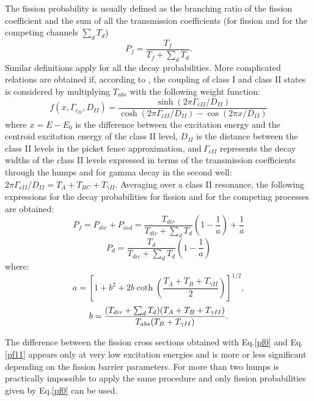The fission probability is usually defined as the branching ratio of the
fission coefficient and the sum of all the transmission coefficients (for
fission and for the competing channels $\sum_dT_d$)
\begin{equation}
P_{f}=\frac{T_{f}}{T_{f}+\sum_{d}T_{d}}.  \label{pf0}
\end{equation}
Similar definitions apply for all the decay probabilities. More complicated
relations are obtained if, according to \cite{Back:74}, the coupling of
class I and class II states is considered by multiplying $T_{abs}$ with the
following weight function:%
\begin{equation}
f(x,\Gamma_{c_{II}},D_{II})=\frac{\sinh(2\pi\Gamma_{cII}/D_{II})}{\cosh
(2\pi\Gamma_{cII}/D_{II})-\cos(2\pi x/D_{II})}
\end{equation}
where $x=E-E_{0}$ is the difference between the excitation energy and the
centroid excitation energy of the class II level, $D_{II}$ is the distance
between the class II levels in the picket fence approximation, and$\ \Gamma
_{cII}$ represents the decay widths of the class II levels expressed in
terms of the transmission coefficients through the humps and for gamma decay
in the second well:\ $2\pi\Gamma_{cII}/D_{II}=T_{A}+T_{BC}+T_{\gamma II}.$
Averaging over a class II resonance, the following expressions for the decay
probabilities for fission and for the competing processes are obtained:%
\begin{equation}
P_{f}=P_{dir}+P_{ind}=\frac{T_{dir}}{T_{dir}+\sum_{d}T_{d}}\left( 1-\frac {1%
}{a}\right) +\frac{1}{a}  \label{pf11}
\end{equation}
\begin{equation}
P_{d}=\frac{T_{d}}{T_{dir}+\sum_{d}T_{d}}\left( 1-\frac{1}{a}\right)
\label{pd}
\end{equation}
where:
\begin{equation}
a=\left[ 1+b^{2}+2b\coth\left( \frac{T_{A}+T_{B}+T_{\gamma II}}{2}\right) %
\right] ^{1/2},  \label{a11}
\end{equation}%
\begin{equation}
b=\frac{(T_{dir}+\sum_{d}T_{d})(T_{A}+T_{B}+T_{\gamma II})}{%
T_{abs}(T_{B}+T_{\gamma II})}.  \label{b11}
\end{equation}

The difference between the fission cross sections obtained with Eq.\ref{pf0}
and Eq.\ref{pf11} appears only at very low excitation energies and is more
or less significant depending on the fission barrier parameters. For more
than two humps is practically impossible to apply the same procedure and
only fission probabilities given by Eq.\ref{pf0} can be used.

